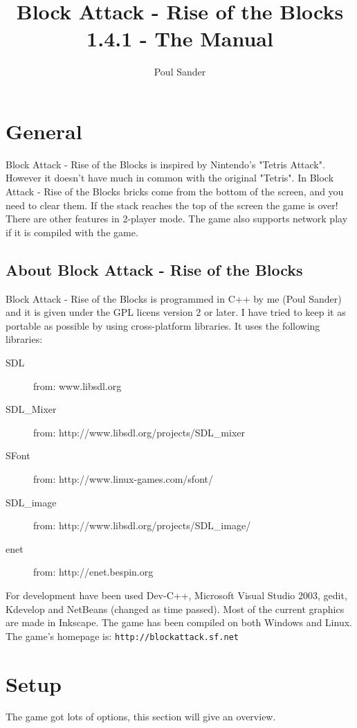 \documentclass[11pt,a4paper]{article}
\begin{document}
\title{Block Attack - Rise of the Blocks 1.4.1 - The Manual}
\author{Poul Sander}
\maketitle
\tableofcontents
\section{General}
Block Attack - Rise of the Blocks is inspired by Nintendo's
"Tetris Attack". However it doesn't have much in common with the
original "Tetris". In Block Attack - Rise of the Blocks bricks
come from the bottom of the screen, and you need to clear them. If
the stack reaches the top of the screen the game is over! There
are other features in 2-player mode. The game also supports network play 
if it is compiled with the game.
\subsection{About Block Attack - Rise of the Blocks}
Block Attack - Rise of the Blocks is programmed in C++ by me (Poul
Sander) and it is given under the GPL licens version 2 or later. I have tried to keep
it as portable as possible by using cross-platform libraries. It
uses the following libraries:
\begin{description}
\item[SDL] from: \newline www.libsdl.org \item[SDL\_Mixer] from:
\newline http://www.libsdl.org/projects/SDL\_mixer \item[SFont]
from: \newline http://www.linux-games.com/sfont/ \item[SDL\_image]
from: \newline http://www.libsdl.org/projects/SDL\_image/
\item[enet] from: \newline http://enet.bespin.org
\end{description}
For development have been used Dev-C++, Microsoft Visual Studio
2003, gedit, Kdevelop and NetBeans (changed as time passed). Most of the current graphics are made in Inkscape. The
game has been compiled on both Windows and Linux. \newline The
game's homepage is:
\verb+http://blockattack.sf.net+
\section{Setup}
The game got lots of options, this section will give an overview.
\end{document}
